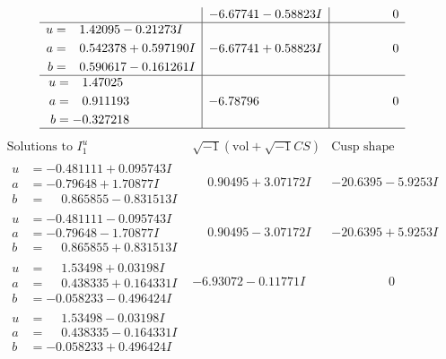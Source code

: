 \documentclass[1p]{elsarticle_modified}
\theoremstyle{definition}
\newcommand{\I}{\sqrt{-1}}
\begin{document}
$$\begin{array}{c|c|c}
 & -6.67741 - 0.58823 I & \phantom{-0.000000 } 0 \\ \hline\begin{aligned}
u &= \phantom{-}1.42095 - 0.21273 I \\
a &= \phantom{-}0.542378 + 0.597190 I \\
b &= \phantom{-}0.590617 - 0.161261 I\end{aligned}
 & -6.67741 + 0.58823 I & \phantom{-0.000000 } 0 \\ \hline\begin{aligned}
u &= \phantom{-}1.47025\phantom{ +0.000000I} \\
a &= \phantom{-}0.911193\phantom{ +0.000000I} \\
b &= -0.327218\phantom{ +0.000000I}\end{aligned}
 & -6.78796\phantom{ +0.000000I} & \phantom{-0.000000 } 0\\
 \hline 
 \end{array}$$\newpage$$\begin{array}{c|c|c}  
\text{Solutions to }I^u_{1}& \I (\text{vol} + \sqrt{-1}CS) & \text{Cusp shape}\\
 \hline 
\begin{aligned}
u &= -0.481111 + 0.095743 I \\
a &= -0.79648 + 1.70877 I \\
b &= \phantom{-}0.865855 - 0.831513 I\end{aligned}
 & \phantom{-}0.90495 + 3.07172 I & -20.6395 - 5.9253 I \\ \hline\begin{aligned}
u &= -0.481111 - 0.095743 I \\
a &= -0.79648 - 1.70877 I \\
b &= \phantom{-}0.865855 + 0.831513 I\end{aligned}
 & \phantom{-}0.90495 - 3.07172 I & -20.6395 + 5.9253 I \\ \hline\begin{aligned}
u &= \phantom{-}1.53498 + 0.03198 I \\
a &= \phantom{-}0.438335 + 0.164331 I \\
b &= -0.058233 - 0.496424 I\end{aligned}
 & -6.93072 - 0.11771 I & \phantom{-0.000000 } 0 \\ \hline\begin{aligned}
u &= \phantom{-}1.53498 - 0.03198 I \\
a &= \phantom{-}0.438335 - 0.164331 I \\
b &= -0.058233 + 0.496424 I\end{aligned}

\end{array}$$
\end{document}
